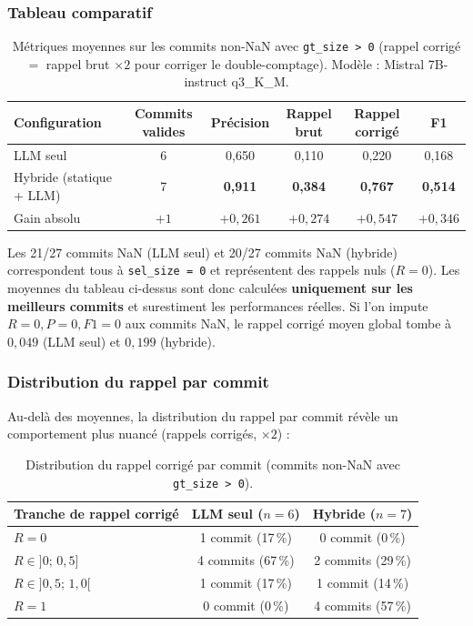 \documentclass[12pt,a4paper]{article}
\begin{document}
\subsubsection{Tableau comparatif}

\begin{table}[H]
\centering
\begin{tabular}{lccccc}
\toprule
\textbf{Configuration} & \textbf{Commits valides} & \textbf{Précision} & \textbf{Rappel brut} & \textbf{Rappel corrigé} & \textbf{F1} \\
\midrule
LLM seul               & 6  & 0{,}650 & 0{,}110 & 0{,}220 & 0{,}168 \\
Hybride (statique + LLM) & 7 & \textbf{0{,}911} & \textbf{0{,}384} & \textbf{0{,}767} & \textbf{0{,}514} \\
\midrule
Gain absolu            & $+1$ & $+0{,}261$ & $+0{,}274$ & $+0{,}547$ & $+0{,}346$ \\
\bottomrule
\end{tabular}
\caption{Métriques moyennes sur les commits non-NaN avec \texttt{gt\_size > 0}
         (rappel corrigé $= $ rappel brut $\times 2$ pour corriger le double-comptage).
         Modèle : Mistral 7B-instruct q3\_K\_M.}
\label{tab:resultats}
\end{table}

\begin{avertissement}
Les 21/27 commits NaN (LLM seul) et 20/27 commits NaN (hybride) correspondent
tous à \texttt{sel\_size = 0} et représentent des rappels nuls ($R = 0$).
Les moyennes du tableau ci-dessus sont donc calculées \textbf{uniquement sur les
meilleurs commits} et surestiment les performances réelles.
Si l'on impute $R = 0, P = 0, F1 = 0$ aux commits NaN, le rappel corrigé moyen
global tombe à $0{,}049$ (LLM seul) et $0{,}199$ (hybride).
\end{avertissement}

\subsubsection{Distribution du rappel par commit}

Au-delà des moyennes, la distribution du rappel par commit révèle un
comportement plus nuancé (rappels corrigés, $\times 2$) :

\begin{table}[H]
\centering
\begin{tabular}{lcc}
\toprule
\textbf{Tranche de rappel corrigé} & \textbf{LLM seul} ($n=6$) & \textbf{Hybride} ($n=7$) \\
\midrule
$R = 0$                        & 1 commit  (17\,\%) & 0 commit   (0\,\%) \\
$R \in ]0;\, 0{,}5]$           & 4 commits (67\,\%) & 2 commits (29\,\%) \\
$R \in ]0{,}5;\, 1{,}0[$       & 1 commit  (17\,\%) & 1 commit  (14\,\%) \\
$R = 1$                        & 0 commit   (0\,\%) & 4 commits (57\,\%) \\
\bottomrule
\end{tabular}
\caption{Distribution du rappel corrigé par commit (commits non-NaN avec \texttt{gt\_size > 0}).}
\label{tab:distribution}
\end{table}
\end{document}
